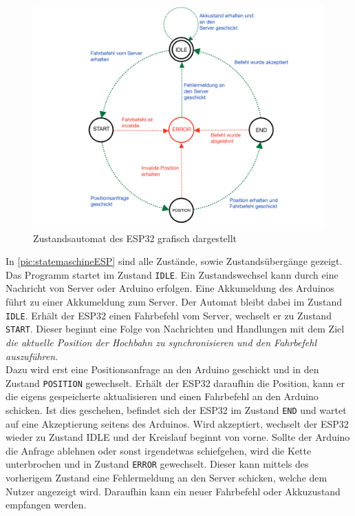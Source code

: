 \begin{figure}[h]
	\begin{center}
		\includegraphics[width=16cm]{stateMaschineESP.pdf}
		\caption{\label{pic:statemaschineESP}Zustandsautomat des ESP32 grafisch dargestellt}
	\end{center}
\end{figure}

In \autoref{pic:statemaschineESP} sind alle Zustände, sowie Zustandsübergänge gezeigt. Das Programm startet im Zustand \texttt{IDLE}. Ein Zustandswechsel kann durch eine Nachricht von Server oder Arduino erfolgen. Eine Akkumeldung des Arduinos führt zu einer Akkumeldung zum Server. Der Automat bleibt dabei im Zustand \texttt{IDLE}.
Erhält der ESP32 einen Fahrbefehl vom Server, wechselt er zu Zustand \texttt{START}. Dieser beginnt eine Folge von Nachrichten und Handlungen mit dem Ziel \textit{die aktuelle Position der Hochbahn zu synchronisieren und den Fahrbefehl auszuführen}. \\
Dazu wird erst eine Positionsanfrage an den Arduino geschickt und in den Zustand \texttt{POSITION} gewechselt. Erhält der ESP32 daraufhin die Position, kann er die eigens gespeicherte aktualisieren und einen Fahrbefehl an den Arduino schicken. Ist dies geschehen, befindet sich der ESP32 im Zustand \texttt{END} und wartet auf eine Akzeptierung seitens des Arduinos. Wird akzeptiert, wechselt der ESP32 wieder zu Zustand IDLE und der Kreislauf beginnt von vorne. Sollte der Arduino die Anfrage ablehnen oder sonst irgendetwas schiefgehen, wird die Kette unterbrochen und in Zustand \texttt{ERROR} gewechselt. Dieser kann mittels des vorherigem Zustand eine Fehlermeldung an den Server schicken, welche dem Nutzer angezeigt wird. Daraufhin kann ein neuer Fahrbefehl oder Akkuzustand empfangen werden. 

